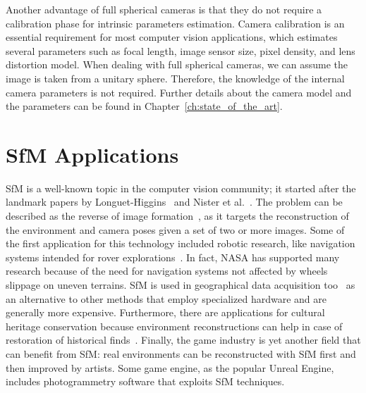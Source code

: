 Another advantage of full spherical cameras is that they do not require a calibration phase for intrinsic parameters estimation. Camera calibration is an essential requirement for most computer vision applications, which estimates several parameters such as focal length, image 
sensor size, pixel density, and lens distortion model. When dealing with full spherical cameras, we can assume the image is taken from a unitary sphere. Therefore, the knowledge of the internal camera parameters is not required. 
Further details about the camera model and the parameters can be found in Chapter~\ref{ch:state_of_the_art}.

\section{SfM Applications}
SfM is a well-known topic in the computer vision community; it started after 
the landmark papers by Longuet-Higgins~\cite{longuet1981computer} and
Nister et al.~\cite{moravec1980obstacle}.
The problem can be described as the reverse of image formation~\cite{Wei2013},
as it targets the reconstruction of the environment 
and camera poses given a set of two or more images.
Some of the first application for this technology included robotic research, 
like navigation systems intended for rover
explorations~\cite{moravec1980obstacle,durrant1996localization}.
In fact, NASA has supported
many research because of the need for navigation systems not affected by wheels
slippage on uneven terrains.
SfM is used in geographical data acquisition too~\cite{fonstad2013topographic,
westoby2012structure, james2012straightforward}
as an alternative to other methods that employ specialized hardware and are generally more expensive.
Furthermore, there are applications for cultural heritage conservation because 
environment reconstructions can help in case of restoration of historical
finds~\cite{kraus2007photogrammetry}.
Finally, the game industry is yet another field that can benefit from 
SfM: real environments can be reconstructed with SfM first and then 
improved by artists. Some game engine, as the popular Unreal Engine,
includes photogrammetry software that exploits SfM techniques.

